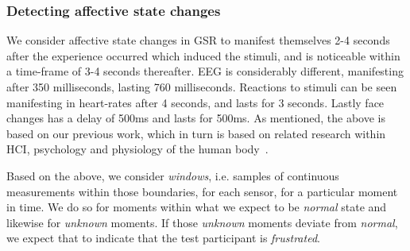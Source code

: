 \subsubsection{Detecting affective state changes}
We consider affective state changes in GSR to manifest themselves 2-4 seconds after the experience occurred which
induced the stimuli, and is noticeable within a time-frame of 3-4 seconds thereafter. EEG is considerably different,
manifesting after 350 milliseconds, lasting 760 milliseconds. Reactions to stimuli can be seen manifesting in heart-rates
after 4 seconds, and lasts for 3 seconds. Lastly face changes has a delay of 500ms and lasts for 500ms. As mentioned,
the above is based on our previous work, which in turn is based on related research within HCI, psychology and
physiology of the human body~\cite{9th_semester_project}.

Based on the above, we consider \textit{windows}, i.e. samples of continuous measurements within those boundaries, for
each sensor, for a particular moment in time. We do so for moments within what we expect to be \textit{normal} state and
likewise for \textit{unknown} moments. If those \textit{unknown} moments deviate from \textit{normal}, we expect that to
indicate that the test participant is \textit{frustrated}.

